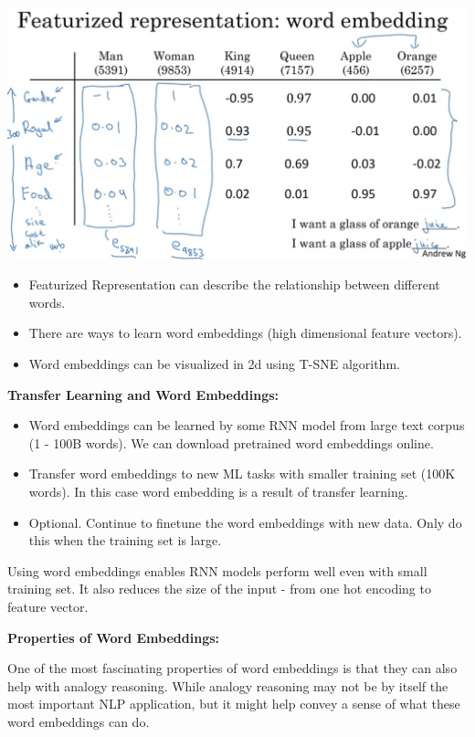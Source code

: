 \documentclass{article}
\begin{document}
\begin{center}
\includegraphics[scale=0.3]{./images/word_embedding.png}
\end{center}

\begin{itemize}
    \item Featurized Representation can describe the relationship between different words.
    \item There are ways to learn word embeddings (high dimensional feature vectors).
    \item Word embeddings can be visualized in 2d using T-SNE algorithm.
\end{itemize}

\noindent \textbf{Transfer Learning and Word Embeddings:}

\begin{itemize}
    \item Word embeddings can be learned by some RNN model from large text corpus (1 - 100B words). We can download pretrained word embeddings online.
    \item Transfer word embeddings to new ML tasks with smaller training set (100K words). In this case word embedding is a result of transfer learning.
    \item Optional. Continue to finetune the word embeddings with new data. Only do this when the training set is large.
\end{itemize}

\noindent Using word embeddings enables RNN models perform well even with small training set. It also reduces the size of the input - from one hot encoding to feature vector.

\bigskip

\noindent \textbf{Properties of Word Embeddings:}

\noindent One of the most fascinating properties of word embeddings is that they can also help with analogy reasoning. While analogy reasoning may not be by itself the most important NLP application, but it might help convey a sense of what these word embeddings can do.
\end{document}

